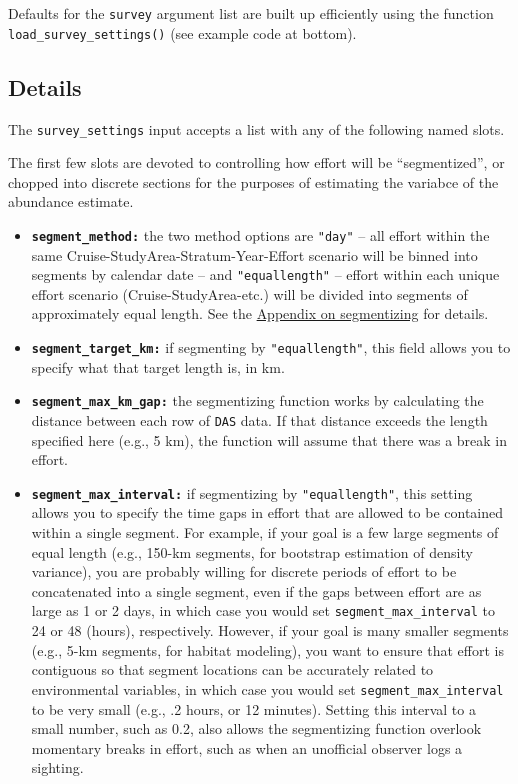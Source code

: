 \documentclass[
]{book}
\begin{document}
Defaults for the \texttt{survey} argument list are built up efficiently using the function \texttt{load\_survey\_settings()} (see example code at bottom).

\hypertarget{details}{%
\subsection*{Details}\label{details}}

The \texttt{survey\_settings} input accepts a list with any of the following named slots.

The first few slots are devoted to controlling how effort will be ``segmentized'', or chopped into discrete sections for the purposes of estimating the variabce of the abundance estimate.

\begin{itemize}
\item
  \textbf{\texttt{segment\_method:}} the two method options are \texttt{"day"} -- all effort within the same Cruise-StudyArea-Stratum-Year-Effort scenario will be binned into segments by calendar date -- and \texttt{"equallength"} -- effort within each unique effort scenario (Cruise-StudyArea-etc.) will be divided into segments of approximately equal length. See the \protect\hyperlink{segmentizing}{Appendix on segmentizing} for details.
\item
  \textbf{\texttt{segment\_target\_km:}} if segmenting by \texttt{"equallength"}, this field allows you to specify what that target length is, in km.
\item
  \textbf{\texttt{segment\_max\_km\_gap:}} the segmentizing function works by calculating the distance between each row of \texttt{DAS} data. If that distance exceeds the length specified here (e.g., 5 km), the function will assume that there was a break in effort.
\item
  \textbf{\texttt{segment\_max\_interval:}} if segmentizing by \texttt{"equallength"}, this setting allows you to specify the time gaps in effort that are allowed to be contained within a single segment. For example, if your goal is a few large segments of equal length (e.g., 150-km segments, for bootstrap estimation of density variance), you are probably willing for discrete periods of effort to be concatenated into a single segment, even if the gaps between effort are as large as 1 or 2 days, in which case you would set \texttt{segment\_max\_interval} to 24 or 48 (hours), respectively. However, if your goal is many smaller segments (e.g., 5-km segments, for habitat modeling), you want to ensure that effort is contiguous so that segment locations can be accurately related to environmental variables, in which case you would set \texttt{segment\_max\_interval} to be very small (e.g., .2 hours, or 12 minutes). Setting this interval to a small number, such as 0.2, also allows the segmentizing function overlook momentary breaks in effort, such as when an unofficial observer logs a sighting.

\end{itemize}
\end{document}
